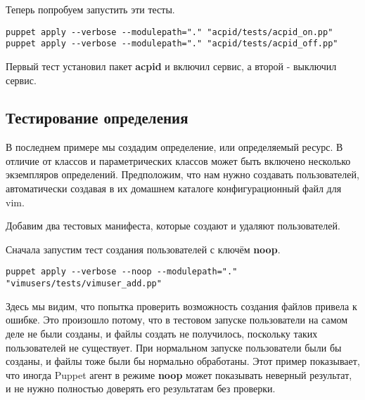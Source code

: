 Теперь попробуем запустить эти тесты.

\begin{verbatim}
puppet apply --verbose --modulepath="." "acpid/tests/acpid_on.pp"
puppet apply --verbose --modulepath="." "acpid/tests/acpid_off.pp"
\end{verbatim}


Первый тест установил пакет \textbf{acpid} и включил сервис, а второй - выключил сервис.

\subsection{Тестирование определения}

В последнем примере мы создадим определение, или определяемый ресурс. В отличие от классов и параметрических классов может быть включено несколько экземпляров определений. Предположим, что нам нужно создавать пользователей, автоматически создавая в их домашнем каталоге конфигурационный файл для vim.



Добавим два тестовых манифеста, которые создают и удаляют пользователей.





Сначала запустим тест создания пользователей с ключём \textbf{noop}.

\begin{verbatim}
puppet apply --verbose --noop --modulepath="." "vimusers/tests/vimuser_add.pp"
\end{verbatim}


Здесь мы видим, что попытка проверить возможность создания файлов привела к ошибке. Это произошло потому, что в тестовом запуске пользователи на самом деле не были созданы, и файлы создать не получилось, поскольку таких пользователей не существует. При нормальном запуске пользователи были бы созданы, и файлы тоже были бы нормально обработаны. Этот пример показывает, что иногда Puppet агент в режиме \textbf{noop} может показывать неверный результат, и не нужно полностью доверять его результатам без проверки.


